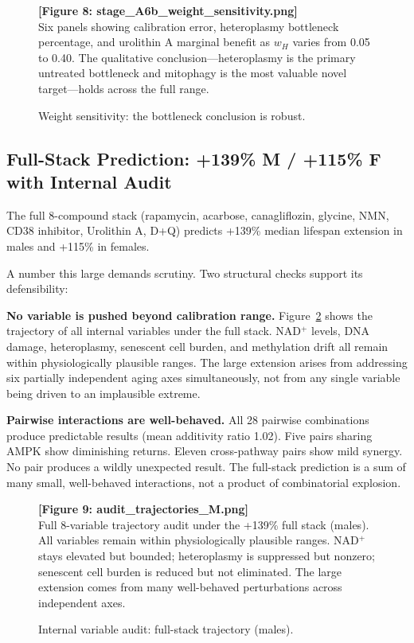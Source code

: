 \documentclass[11pt]{article}
\begin{document}
\begin{figure}[ht]
\centering
\textbf{[Figure 8: stage\_A6b\_weight\_sensitivity.png]}\\[4pt]
\small Six panels showing calibration error, heteroplasmy bottleneck percentage, and urolithin A marginal benefit as $w_H$ varies from 0.05 to 0.40. The qualitative conclusion---heteroplasmy is the primary untreated bottleneck and mitophagy is the most valuable novel target---holds across the full range.
\caption{Weight sensitivity: the bottleneck conclusion is robust.}
\label{fig:weight}
\end{figure}

\subsection{Full-Stack Prediction: +139\% M / +115\% F with Internal Audit}

The full 8-compound stack (rapamycin, acarbose, canagliflozin, glycine, NMN, CD38 inhibitor, Urolithin A, D+Q) predicts +139\% median lifespan extension in males and +115\% in females.

A number this large demands scrutiny. Two structural checks support its defensibility:

\textbf{No variable is pushed beyond calibration range.} Figure~\ref{fig:audit} shows the trajectory of all internal variables under the full stack. NAD$^+$ levels, DNA damage, heteroplasmy, senescent cell burden, and methylation drift all remain within physiologically plausible ranges. The large extension arises from addressing six partially independent aging axes simultaneously, not from any single variable being driven to an implausible extreme.

\textbf{Pairwise interactions are well-behaved.} All 28 pairwise combinations produce predictable results (mean additivity ratio 1.02). Five pairs sharing AMPK show diminishing returns. Eleven cross-pathway pairs show mild synergy. No pair produces a wildly unexpected result. The full-stack prediction is a sum of many small, well-behaved interactions, not a product of combinatorial explosion.

\begin{figure}[ht]
\centering
\textbf{[Figure 9: audit\_trajectories\_M.png]}\\[4pt]
\small Full 8-variable trajectory audit under the +139\% full stack (males). All variables remain within physiologically plausible ranges. NAD$^+$ stays elevated but bounded; heteroplasmy is suppressed but nonzero; senescent cell burden is reduced but not eliminated. The large extension comes from many well-behaved perturbations across independent axes.
\caption{Internal variable audit: full-stack trajectory (males).}
\label{fig:audit}
\end{figure}
\end{document}
